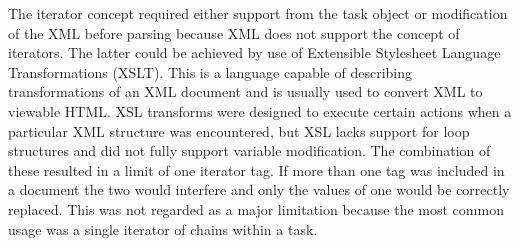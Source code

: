 


The iterator concept required either support from the task object or modification of the XML before parsing because XML does not support the concept of iterators. The latter could be achieved by use of Extensible Stylesheet Language Transformations (XSLT). This is a language capable of describing transformations of an XML document and is usually used to convert XML to viewable HTML. XSL transforms were designed to execute certain actions when a particular XML structure was encountered, but XSL lacks support for loop structures and did not fully support variable modification. The combination of these resulted in a limit of one iterator tag. If more than one tag was included in a document the two would interfere and only the values of one would be correctly replaced. This was not regarded as a major limitation because the most common usage was a single iterator of chains within a task.


